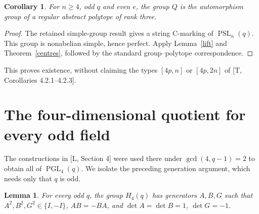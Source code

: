 \documentclass[11pt,a4paper]{article}
\newtheorem{lemma}[theorem]{Lemma}
\newtheorem{corollary}[theorem]{Corollary}
\newcommand{\PSL}{\operatorname{PSL}}
\newcommand{\PGL}{\operatorname{PGL}}
\begin{document}
\begin{corollary}\label{centralexistence}
For $n\geq4$, odd $q$ and even $e$, the group $Q$ is the automorphism
group of a regular abstract polytope of rank three.
\end{corollary}
\begin{proof}
The retained simple-group result gives a string C-marking of
$\PSL_n(q)$. This group is nonabelian simple, hence perfect.
Apply Lemma~\ref{lift} and Theorem~\ref{centres}, followed by the
standard group--polytope correspondence.
\end{proof}
This proves existence, without claiming the types $[4p,n]$ or
$[4p,2n]$ of [T, Corollaries 4.2.1--4.2.3].

\section{The four-dimensional quotient for every odd field}
The constructions in [L, Section 4] were used there under
$\gcd(4,q-1)=2$ to obtain all of $\PGL_4(q)$. We isolate the preceding
generation argument, which needs only that $q$ is odd.
\begin{lemma}\label{four}
For every odd $q$, the group $H_4(q)$ has generators $A,B,G$ such
that $A^2,B^2,G^2\in\{I,-I\}$, $AB=-BA$, and
$\det A=\det B=1$, $\det G=-1$.
\end{lemma}
\end{document}
